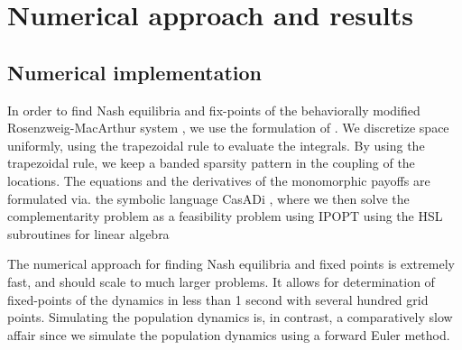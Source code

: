 \section{Numerical approach and results}
\subsection{Numerical implementation}
In order to find Nash equilibria and fix-points of the behaviorally modified Rosenzweig-MacArthur  system , we use the formulation of . We discretize space uniformly, using the trapezoidal rule to evaluate the integrals. By using the trapezoidal rule, we keep a banded sparsity pattern in the coupling of the locations. The equations  and the derivatives of the monomorphic payoffs  are formulated via. the symbolic language CasADi \citep{Andersson2019}, where we then solve the complementarity problem as a feasibility problem using IPOPT \citep{wachter2006implementation} using the HSL subroutines for linear algebra \citep{hsl2007collection}

The numerical approach for finding Nash equilibria and fixed points is extremely fast, and should scale to much larger problems. It allows for determination of fixed-points of the dynamics in less than 1 second with several hundred grid points. Simulating the population dynamics is, in contrast, a comparatively slow affair since we simulate the population dynamics using a forward Euler method.

